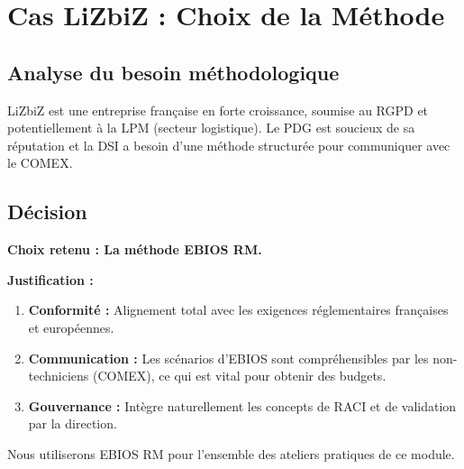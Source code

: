 \section{Cas LiZbiZ : Choix de la Méthode}

\subsection{Analyse du besoin méthodologique}

LiZbiZ est une entreprise française en forte croissance, soumise au RGPD et potentiellement à la LPM (secteur logistique). Le PDG est soucieux de sa réputation et la DSI a besoin d'une méthode structurée pour communiquer avec le COMEX.

\subsection{Décision}

\begin{boxlizbiz}
\textbf{Choix retenu : La méthode EBIOS RM.}

\textbf{Justification :}
\begin{enumerate}
    \item \textbf{Conformité :} Alignement total avec les exigences réglementaires françaises et européennes.
    \item \textbf{Communication :} Les scénarios d'EBIOS sont compréhensibles par les non-techniciens (COMEX), ce qui est vital pour obtenir des budgets.
    \item \textbf{Gouvernance :} Intègre naturellement les concepts de RACI et de validation par la direction.
\end{enumerate}

Nous utiliserons EBIOS RM pour l'ensemble des ateliers pratiques de ce module.
\end{boxlizbiz}


